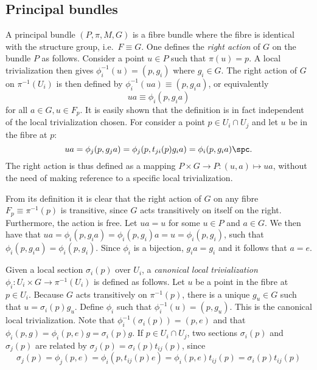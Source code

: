 \documentclass[10pt,reqno]{amsart}
\numberwithin{equation}{section}
\begin{document}
\subsection{Principal bundles}

A principal bundle $(P,\pi,M,G)$ is a fibre bundle where the 
fibre is identical with the structure group, i.e.\ $F \equiv G$.  
One defines the \emph{right action} of $G$ on the bundle $P$ as 
follows. Consider a point $u \in P$ such that $\pi(u) = p$. A 
local trivialization then gives $\phi_i^{-1}(u) = (p,g_i)$ where 
$g_i \in G$. The right action of $G$ on $\pi^{-1}(U_i)$ is then 
defined by $\phi_i^{-1}(ua) \equiv (p,g_ia)$, or equivalently
%
\begin{equation}
	ua \equiv \phi_i(p,g_i a)
\end{equation}
%
for all $a \in G, u \in F_p$. It is easily shown that the 
definition is in fact independent of the local trivialization 
chosen. For consider a point $p \in U_i \cap U_j$ and let $u$ be 
in the fibre at $p$:
%
\begin{displaymath}
	ua = \phi_j(p,g_j a) = \phi_j(p,t_{ji}(p)g_i a) = \phi_i(p,g_i 
	a)\spc.
\end{displaymath}
The right action is thus defined as a mapping $P \times G 
\rightarrow P : (u,a) \mapsto ua$, without the need of making 
reference to a specific local trivialization.

From its definition it is clear that the right action of $G$ on 
any fibre $F_p \equiv \pi^{-1}(p)$ is transitive, since $G$ acts 
transitively on itself on the right. Furthermore, the action is 
free. Let $ua = u$ for some  $u \in P$ and $a \in G$. We then 
have that $ua = \phi_i(p,g_i a) = \phi_i(p,g_i)a = u = 
\phi_i(p,g_i)$, such that $\phi_i(p,g_i a) = \phi_i(p,g_i)$.  
Since $\phi_i$ is a bijection, $g_i a = g_i$ and it follows that 
$a = e$.

\blankline
Given a local section $\sigma_i(p)$ over $U_i$, a \emph{canonical 
	local trivialization} $\phi_i : U_i \times G \rightarrow 
\pi^{-1}(U_i)$ is defined as follows.  Let $u$ be a point in the 
fibre at $p \in U_i$.  Because $G$ acts transitively on 
$\pi^{-1}(p)$, there is a unique $g_u \in G$ such that $u = 
\sigma_i(p) g_u$. Define $\phi_i$ such that $\phi_i^{-1}(u) = 
(p,g_u)$. This is the canonical local trivialization.
Note that $\phi_i^{-1}(\sigma_i(p)) = (p,e)$ and that 
$\phi_i(p,g) = \phi_i(p,e)g = \sigma_i(p)g$. If $p \in U_i \cap 
U_j$, two sections $\sigma_i(p)$ and $\sigma_j(p)$ are related by 
$\sigma_j(p) = \sigma_i(p)t_{ij}(p)$, since
%
\begin{displaymath}
	\sigma_j(p) = \phi_j(p,e) = \phi_i(p,t_{ij}(p)e) = 
	\phi_i(p,e)t_{ij}(p) = \sigma_i(p)t_{ij}(p)
\end{displaymath}
%
\end{document}

